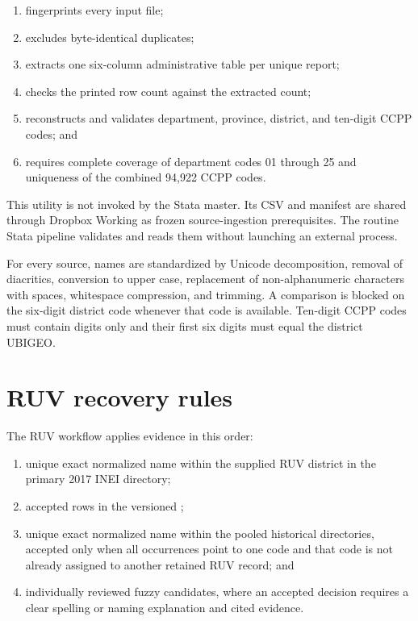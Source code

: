 \documentclass[11pt]{article}
\newcommand{\code}[1]{\texttt{\detokenize{#1}}}
\begin{document}
\begin{enumerate}
  \item fingerprints every input file;
  \item excludes byte-identical duplicates;
  \item extracts one six-column administrative table per unique report;
  \item checks the printed row count against the extracted count;
  \item reconstructs and validates department, province, district, and
        ten-digit CCPP codes; and
  \item requires complete coverage of department codes 01 through 25 and
        uniqueness of the combined 94,922 CCPP codes.
\end{enumerate}

This utility is not invoked by the Stata master. Its CSV and manifest are
shared through Dropbox Working as frozen source-ingestion prerequisites. The
routine Stata pipeline validates and reads them without launching an external
process.

For every source, names are standardized by Unicode decomposition, removal of
diacritics, conversion to upper case, replacement of non-alphanumeric
characters with spaces, whitespace compression, and trimming. A comparison is
blocked on the six-digit district code whenever that code is available.
Ten-digit CCPP codes must contain digits only and their first six digits must
equal the district UBIGEO.

\section{RUV recovery rules}

The RUV workflow applies evidence in this order:

\begin{enumerate}
  \item unique exact normalized name within the supplied RUV district in the
        primary 2017 INEI directory;
  \item accepted rows in the versioned
        \code{ruv-ubigeo-adjudication.csv};
  \item unique exact normalized name within the pooled historical directories,
        accepted only when all occurrences point to one code and that code is
        not already assigned to another retained RUV record; and
  \item individually reviewed fuzzy candidates, where an accepted decision
        requires a clear spelling or naming explanation and cited evidence.
\end{enumerate}
\end{document}
